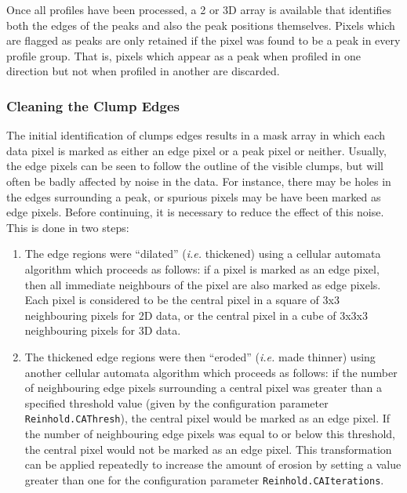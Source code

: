 \documentclass[twoside,11pt]{article}
\renewcommand{\_}{\texttt{\symbol{95}}}
\begin{document}
Once all profiles have been processed, a 2 or 3D array is available that
identifies both the edges of the peaks and also the peak positions
themselves. Pixels which are flagged as peaks are only retained if the
pixel was found to be a peak in every profile group. That is, pixels
which appear as a peak when profiled in one direction but not when
profiled in another are discarded.

\subsubsection{Cleaning the Clump Edges}
The initial identification of clumps edges results in a mask array in
which each data pixel is marked as either an edge pixel or a peak pixel
or neither. Usually, the edge pixels can be seen to follow the outline of
the visible clumps, but will often be badly affected by noise in the
data. For instance, there may be holes in the edges surrounding a peak,
or spurious pixels may be have been marked as edge pixels. Before
continuing, it is necessary to reduce the effect of this noise. This is
done in two steps:

\begin{enumerate}
\item The edge regions were ``dilated'' (\emph{i.e.} thickened) using a
cellular automata algorithm which proceeds as follows: if a pixel is
marked as an edge pixel, then all immediate neighbours of the pixel are
also marked as edge pixels. Each pixel is considered to be the central
pixel in a square of 3x3 neighbouring pixels for 2D data, or the central
pixel in a cube of 3x3x3 neighbouring pixels for 3D data.

\item The thickened edge regions were then ``eroded'' (\emph{i.e.} made
thinner) using another cellular automata algorithm which proceeds as follows: 
if the number of neighbouring edge pixels surrounding a central pixel was
greater than a specified threshold value (given by the configuration
parameter {\tt Reinhold.CAThresh}), the central pixel would be marked as
an edge pixel. If the number of neighbouring edge pixels was equal to or
below this threshold, the central pixel would not be marked as an edge pixel. 
This transformation can be applied repeatedly to increase the amount of
erosion by setting a value greater than one for the configuration parameter 
{\tt Reinhold.CAIterations}.

\end{enumerate}
\end{document}
